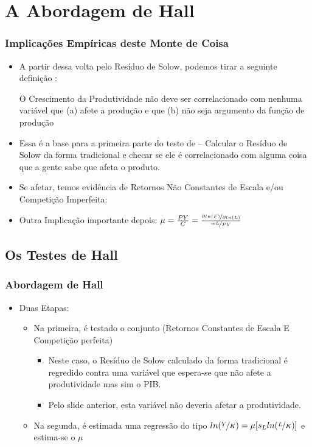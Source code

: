 \documentclass{beamer}
\begin{document}
\section{A Abordagem de Hall}
\begin{frame}[fragile]\frametitle{Implicações Empíricas deste Monte de Coisa}
\scriptsize
    \begin{itemize}
        \item A partir dessa volta pelo Resíduo de Solow, podemos tirar a seguinte definição \citet{Hall1991a}:
    \begin{definition}    
        O Crescimento da Produtividade não deve ser correlacionado com nenhuma variável que (a) afete a produção e que (b) não seja argumento da função de produção
    \end{definition}
        \item Essa é a base para a primeira parte do teste de \citet{Hall1988} -- Calcular o Resíduo de Solow da forma tradicional e checar se ele é correlacionado com alguma coisa que a gente sabe que afeta o produto.
        \item Se afetar, temos evidência de Retornos Não Constantes de Escala e/ou Competição Imperfeita:
        \item Outra Implicação importante depois: $\mu=\frac{PY}{C}=\frac{\nicefrac{\partial ln(F)}{\partial ln(L)}}{\nicefrac{wL}{PY}}$
    \end{itemize}

\end{frame}

\subsection{Os Testes de Hall}
\begin{frame}[fragile]\frametitle{Abordagem de Hall}
    \begin{itemize}
        \item Duas Etapas:
        \begin{itemize}
            \item Na primeira, é testado o conjunto (Retornos Constantes de Escala E Competição perfeita)
            \begin{itemize}
                \item Neste caso, o Resíduo de Solow calculado da forma tradicional é regredido contra uma variável que espera-se que não afete a produtividade mas sim o PIB. 
                \item Pelo slide anterior, esta variável não deveria afetar a produtividade.
            \end{itemize}
            \item Na segunda, é estimada uma regressão do tipo $ln(\nicefrac{Y}{K})=\mu [s_L ln(\nicefrac{L}{K})]$ e estima-se o $\mu$
        \end{itemize}
    \end{itemize}

\end{frame}
\end{document}
